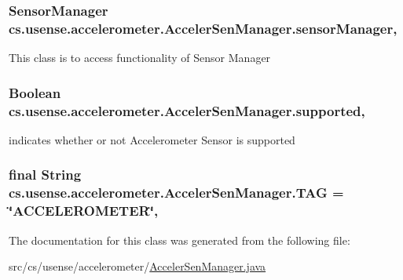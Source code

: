 \subsubsection[{sensor\+Manager}]{\setlength{\rightskip}{0pt plus 5cm}Sensor\+Manager cs.\+usense.\+accelerometer.\+Acceler\+Sen\+Manager.\+sensor\+Manager\hspace{0.3cm}{\ttfamily [static]}, {\ttfamily [private]}}\label{classcs_1_1usense_1_1accelerometer_1_1_acceler_sen_manager_ae61bba99e8cd255020dbe54154ec9b16}
This class is to access functionality of Sensor Manager \hypertarget{classcs_1_1usense_1_1accelerometer_1_1_acceler_sen_manager_a91923331c2cbcbe9ba024b484a7c2f50}{}
\subsubsection[{supported}]{\setlength{\rightskip}{0pt plus 5cm}Boolean cs.\+usense.\+accelerometer.\+Acceler\+Sen\+Manager.\+supported\hspace{0.3cm}{\ttfamily [static]}, {\ttfamily [private]}}\label{classcs_1_1usense_1_1accelerometer_1_1_acceler_sen_manager_a91923331c2cbcbe9ba024b484a7c2f50}
indicates whether or not Accelerometer Sensor is supported \hypertarget{classcs_1_1usense_1_1accelerometer_1_1_acceler_sen_manager_aa9164433aafc7854e44b1fb0026aa269}{}
\subsubsection[{T\+A\+G}]{\setlength{\rightskip}{0pt plus 5cm}final String cs.\+usense.\+accelerometer.\+Acceler\+Sen\+Manager.\+T\+A\+G = \char`\"{}A\+C\+C\+E\+L\+E\+R\+O\+M\+E\+T\+E\+R\char`\"{}\hspace{0.3cm}{\ttfamily [static]}, {\ttfamily [private]}}\label{classcs_1_1usense_1_1accelerometer_1_1_acceler_sen_manager_aa9164433aafc7854e44b1fb0026aa269}


The documentation for this class was generated from the following file\+:\begin{DoxyCompactItemize}
\item 
src/cs/usense/accelerometer/\hyperlink{_acceler_sen_manager_8java}{Acceler\+Sen\+Manager.\+java}\end{DoxyCompactItemize}
